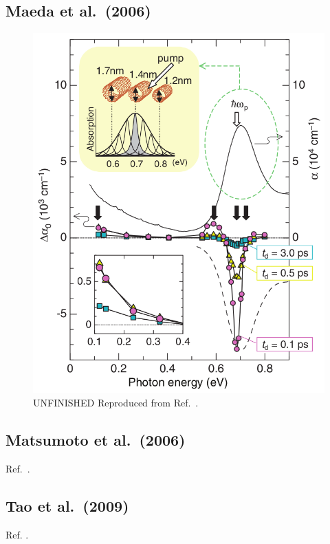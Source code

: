 \subsection{Maeda et al.\ (2006)}

\begin{figure}[ht]
	\centering
	\includegraphics[scale=0.4]{images/chapter_prior_works/stark_shift_maeda}
	\caption{{\color{red} UNFINISHED} Reproduced from Ref.\ \cite{maeda2006gigantic}.}
\end{figure}

\subsection{Matsumoto et al.\ (2006)}

Ref.\ \cite{matsumoto2006optical}.

\subsection{Tao et al.\ (2009)}

Ref. \cite{tao2009subpicosecond}.

